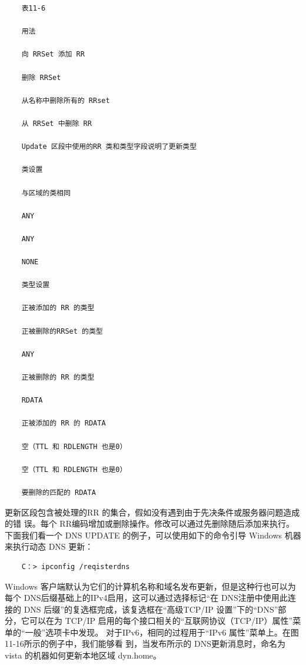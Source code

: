 \begin{verbatim}
    表11-6

    用法

    向 RRSet 添加 RR

    删除 RRSet

    从名称中删除所有的 RRset

    从 RRSet 中删除 RR

    Update 区段中使用的RR 类和类型字段说明了更新类型

    类设置

    与区域的类相同

    ANY

    ANY

    NONE

    类型设置

    正被添加的 RR 的类型

    正被删除的RRSet 的类型

    ANY

    正被删除的 RR 的类型

    RDATA

    正被添加的 RR 的 RDATA

    空（TTL 和 RDLENGTH 也是0）

    空（TTL 和 RDLENGTH 也是0）

    要删除的匹配的 RDATA
\end{verbatim}

更新区段包含被处理的RR 的集合，假如没有遇到由于先决条件或服务器问题造成的错
误。每个 RR编码增加或删除操作。修改可以通过先删除随后添加来执行。下面我们看一个
DNS UPDATE 的例子，可以使用如下的命令引导 Windows 机器来执行动态 DNS 更新：

\begin{verbatim}
    C：> ipconfig /reqisterdns
\end{verbatim}

Windows 客户端默认为它们的计算机名称和域名发布更新，但是这种行也可以为每个
DNS后缀基础上的IPv4启用，这可以通过选择标记“在 DNS注册中使用此连接的 DNS
后缀”的复选框完成，该复选框在“高级TCP/IP 设置”下的“DNS”部分，它可以在为
TCP/IP 启用的每个接口相关的“互联网协议（TCP/IP）属性”菜单的“一般”选项卡中发现。
对于IPv6，相同的过程用于“IPv6 属性”菜单上。在图11-16所示的例子中，我们能够看
到，当发布所示的 DNS更新消息时，命名为vista 的机器如何更新本地区域 dyn.home。

